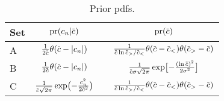 
\begin{table}
  \caption{Prior pdfs.}
  \label{tab:priors}
  \centering
  \begin{tabular}{lccc}
    \toprule
    Set & $\dmspr(c_n|\dmscbar)$ && $\dmspr(\dmscbar)$ \\
    \hline
    A & $\frac{1}{2\dmscbar}\theta(\dmscbar-|c_n|)$ &\qquad&
    $ \frac{1}{\dmscbar\ln\dmscbar_>/\dmscbar_<}\theta(
    \dmscbar-\dmscbar_<)\theta(\dmscbar_>-\dmscbar)$ \\
    B & $\frac{1}{2\dmscbar}\theta(\dmscbar-|c_n|)$ &&
    $ \frac{1}{\dmscbar\sigma\sqrt{2\pi}}\exp\bigl[
    - \frac{(\ln\dmscbar)^2}{2\sigma^2}\bigr]$ \\
    C & $ \frac{1}{\dmscbar\sqrt{2\pi}}\exp\bigl(
    - \frac{c_n^2}{2\dmscbar^2}\bigr)$ &&
    $ \frac{1}{\dmscbar\ln\dmscbar_>/\dmscbar_<}\theta(
    \dmscbar-\dmscbar_<)\theta(\dmscbar_>-\dmscbar)$ \\
    \bottomrule
  \end{tabular}
\end{table}
